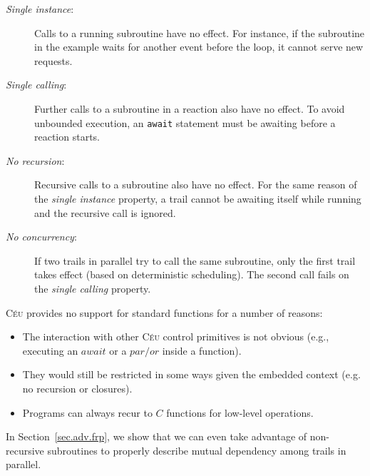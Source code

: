 \documentclass{acm_proc_article-sp}
\newcommand{\CEU}{\textsc{C\'{e}u}\xspace}
\newcommand{\code}[1] {{\small{\texttt{#1}}}}
\newcommand{\1}{\;}
\newcommand{\2}{\;\;}
\newcommand{\3}{\;\;\;}
\newcommand{\5}{\;\;\;\;\;}
\begin{document}
\begin{description}
\item[\emph{Single instance}:] Calls to a running subroutine have no effect.
For instance, if the subroutine in the example waits for another event before 
the loop, it cannot serve new requests.
%
\item[\emph{Single calling}:] Further calls to a subroutine in a reaction also 
have no effect.
To avoid unbounded execution, an \code{await} statement must be awaiting before 
a reaction starts.
%
\item[\emph{No recursion}:] Recursive calls to a subroutine also have no 
effect.
For the same reason of the \emph{single instance} property, a trail cannot be 
awaiting itself while running and the recursive call is ignored.
%
\item[\emph{No concurrency}:] If two trails in parallel try to call the same 
subroutine, only the first trail takes effect (based on deterministic 
scheduling).
The second call fails on the \emph{single calling} property.
\end{description}

\vspace{5pt}
\CEU provides no support for standard functions for a number of reasons:
\begin{itemize}
\item The interaction with other \CEU control primitives is not obvious (e.g., 
executing an $await$ or a $par/or$ inside a function).
\item They would still be restricted in some ways given the embedded context 
(e.g.  no recursion or closures).
\item Programs can always recur to $C$ functions for low-level operations.
\end{itemize}

\begin{comment}
Regardless of the limitations, this form of subroutines is widely adopted in 
\CEU programs, given that they were designed to work with the other control 
mechanisms.
Keep in mind that the typical reactive organization of programs (awaiting an 
external stimulus, reacting to it, and going back to awaiting) does not demand 
unrestricted subroutines.
\end{comment}
In Section~\ref{sec.adv.frp}, we show that we can even take advantage of 
non-recursive subroutines to properly describe mutual dependency among trails 
in parallel.
\end{document}
